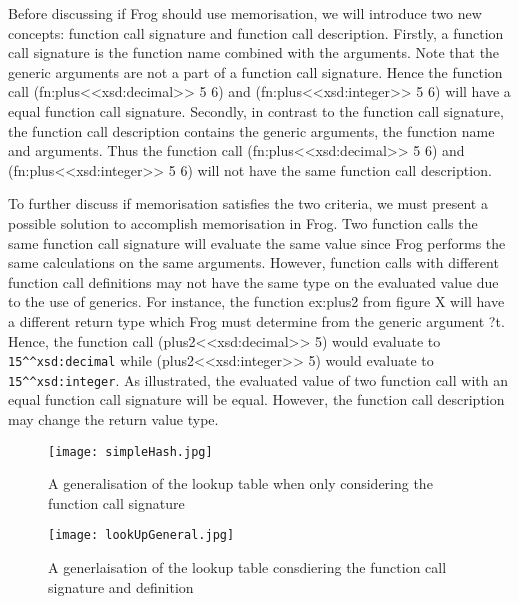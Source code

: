 \para 
Before discussing if Frog should use memorisation, we will introduce two new concepts: function call signature and function call description. 
Firstly, a function call signature is the function name combined with the arguments. Note that the generic arguments are not a part of a function call signature. Hence the function call (fn:plus<<xsd:decimal>> 5 6) and (fn:plus<<xsd:integer>> 5 6) will have a equal function call signature. Secondly, in contrast to the function call signature, the function call description contains the generic arguments, the function name and arguments. Thus the function call (fn:plus<<xsd:decimal>> 5 6) and (fn:plus<<xsd:integer>> 5 6) will not have the same function call description.

\para
To further discuss if memorisation satisfies the two criteria, we must present a possible solution to accomplish memorisation in Frog. Two function calls the same function call signature will evaluate the same value since Frog performs the same calculations on the same arguments. However, function calls with different function call definitions may not have the same type on the evaluated value due to the use of generics. For instance, the function ex:plus2 from figure X will have a different return type which Frog must determine from the generic argument ?t. Hence, the function call (plus2<<xsd:decimal>> 5)  would evaluate to \lstinline{15^^xsd:decimal} while (plus2<<xsd:integer>> 5) would evaluate to \lstinline{15^^xsd:integer}. As illustrated, the evaluated value of two function call with an equal function call signature will be equal. However, the function call description may change the return value type.

\begin{figure}
    \centering
    \begin{minipage}{.5\textwidth}
      \centering
      \texttt{[image: simpleHash.jpg]}
      \caption{A generalisation of the lookup table when only considering the function call signature}
      \label{fig:simpleHash}
    \end{minipage}%
    \begin{minipage}{.5\textwidth}
      \centering
      \texttt{[image: lookUpGeneral.jpg]}
      \caption{A generlaisation of the lookup table consdiering the function call signature and definition}
      \label{fig:lookUpGeneral}
    \end{minipage}
\end{figure}

